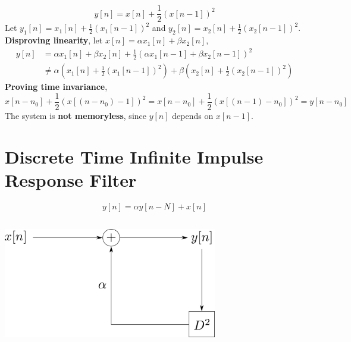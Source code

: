 \documentclass{article}
\begin{document}
\subsection{}

\begin{equation}
    y[n] = x[n] + \frac{1}{2} (x[n - 1])^2
\end{equation}
Let \(y_1[n] = x_1[n] + \frac{1}{2} (x_1[n - 1])^2\) and \(y_2[n] = x_2[n] + \frac{1}{2} (x_2[n - 1])^2\).
\textbf{Disproving linearity}, let \(x[n] = \alpha x_1[n] + \beta x_2[n]\),
\begin{align}
    y[n] &= \alpha x_1[n] + \beta x_2[n] + \frac{1}{2} (\alpha x_1[n - 1] + \beta x_2[n - 1])^2 \\
    &\neq \alpha \left(x_1[n] + \frac{1}{2} (x_1[n - 1])^2\right) + \beta \left(x_2[n] + \frac{1}{2} (x_2[n - 1])^2\right)
\end{align}
\textbf{Proving time invariance},
\begin{equation}
    x[n - n_0] + \frac{1}{2} (x[(n - n_0) - 1])^2 = x[n - n_0] + \frac{1}{2} (x[(n - 1) - n_0])^2 = y[n - n_0]
\end{equation}
The system is \textbf{not memoryless}, since \(y[n]\) depends on \(x[n - 1]\).

\section{Discrete Time Infinite Impulse Response Filter}

\begin{equation}
    y[n] = \alpha y[n - N] + x[n]
\end{equation}

\subsection{}

\begin{center}
    \includegraphics[width=0.7\textwidth]{q3-1.png}
\end{center}
\end{document}
